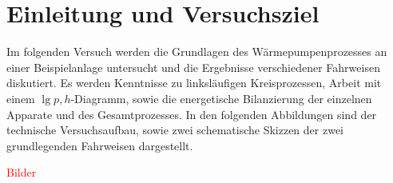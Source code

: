 \section{Einleitung und Versuchsziel}
\label{sec:aufgabenstellung}

Im folgenden Versuch werden die Grundlagen des Wärmepumpenprozesses an einer Beispielanlage untersucht und die Ergebnisse verschiedener Fahrweisen diskutiert. Es werden Kenntnisse zu linksläufigen Kreisprozessen, Arbeit mit einem $\lg{p}, h$-Diagramm, sowie die energetische Bilanzierung der einzelnen Apparate und des Gesamtprozesses.
In den folgenden Abbildungen sind der technische Versuchsaufbau, sowie zwei schematische Skizzen der zwei grundlegenden Fahrweisen dargestellt.

\textcolor{red}{Bilder}


